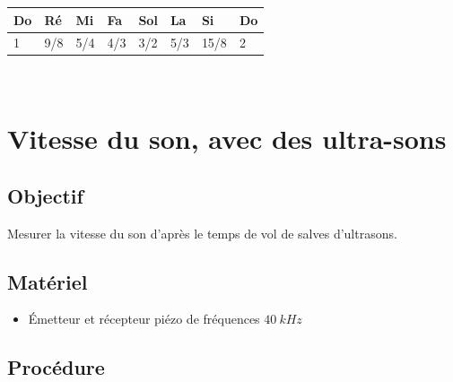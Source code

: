 \documentclass{book}
\begin{document}
\begin{tabular}{|l|l|l|l|l|l|l|l|}
\hline
Do&Ré&Mi&Fa&Sol&La&Si&Do
\\ \hline
1&9/8&5/4&4/3&3/2&5/3&15/8&2
\\ \hline
\end{tabular}\\[0.5em]










\section{Vitesse du son, avec des ultra-sons}



\subsection{Objectif}


Mesurer la vitesse du son d'après le temps de vol de salves d'ultrasons.




\subsection{Matériel}


\begin{itemize}
  \item Émetteur et récepteur piézo de fréquences $40\ kHz$
\end{itemize}

\subsection{Procédure}
\end{document}
